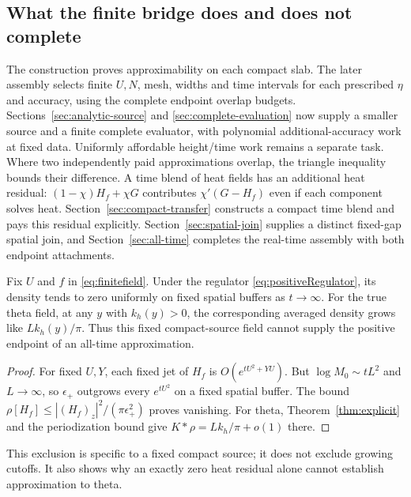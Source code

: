 


\subsection{What the finite bridge does and does not complete}
The construction proves approximability on each compact slab.
The later assembly selects finite $U,N$, mesh, widths and time
intervals for each prescribed $\eta$ and accuracy, using the complete
endpoint overlap budgets. Sections~\ref{sec:analytic-source} and
\ref{sec:complete-evaluation} now supply a smaller source and a finite
complete evaluator, with polynomial additional-accuracy work at fixed data.
Uniformly affordable height/time work remains a separate task.
Where two independently paid approximations overlap, the triangle
inequality bounds their difference. A time blend of heat fields has
an additional heat residual: $(1-\chi)H_f+\chi G$ contributes
$\chi'(G-H_f)$ even if each component solves heat. Section~\ref{sec:compact-transfer} constructs a compact time blend and
pays this residual explicitly. Section~\ref{sec:spatial-join} supplies
a distinct fixed-gap spatial join, and Section~\ref{sec:all-time}
completes the real-time assembly with both endpoint attachments.

\begin{proposition}
\label{prop:fixedsource}
Fix $U$ and $f$ in \eqref{eq:finitefield}. Under the regulator
\eqref{eq:positiveRegulator}, its density tends to zero uniformly on
fixed spatial buffers as $t\to\infty$. For the true theta field, at
any $y$ with $k_h(y)>0$, the corresponding averaged density grows
like $Lk_h(y)/\pi$. Thus this fixed compact-source field cannot supply
the positive endpoint of an all-time approximation.
\end{proposition}
\begin{proof}
For fixed $U,Y$, each fixed jet of $H_f$ is $O(e^{tU^2+YU})$.
But $\log M_0\sim tL^2$ and $L\to\infty$, so $\epsilon_+$
outgrows every $e^{tU^2}$ on a fixed spatial buffer.
The bound $\rho[H_f]\le|(H_f)_z|^2/(\pi\epsilon_+^2)$ proves
vanishing. For theta, Theorem~\ref{thm:explicit} and the periodization
bound give $K*\rho=Lk_h/\pi+o(1)$ there.
\end{proof}
This exclusion is specific to a fixed compact source; it does not
exclude growing cutoffs. It also shows why an exactly zero heat
residual alone cannot establish approximation to theta.


